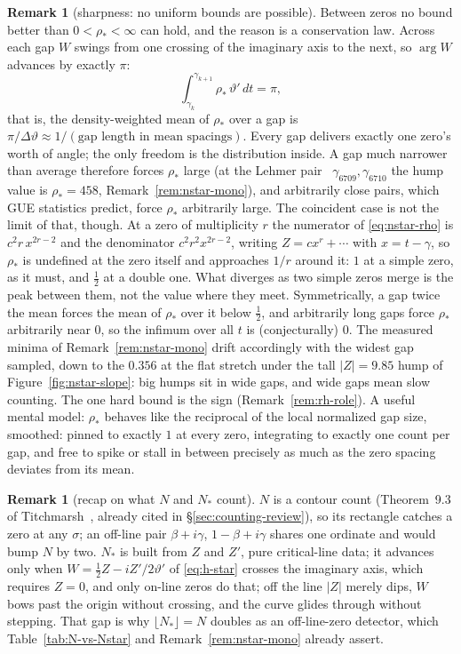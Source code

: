 \documentclass[11pt]{article}
\theoremstyle{definition}
\newtheorem{remark}[theorem]{Remark}
\begin{document}
\begin{remark}[sharpness: no uniform bounds are possible]
\label{rem:no-bounds}
Between zeros no bound better than $0<\rho_{\ast}<\infty$ can hold, and the reason
is a conservation law. Across each gap $W$ swings from one crossing of the
imaginary axis to the next, so $\arg W$ advances by exactly $\pi$:
\[
\int_{\gamma_k}^{\gamma_{k+1}}\rho_{\ast}\,\vartheta'\,dt=\pi ,
\]
that is, the density-weighted mean of $\rho_{\ast}$ over a gap is
$\pi/\Delta\vartheta\approx1/(\text{gap length in mean spacings})$. Every gap
delivers exactly one zero's worth of angle; the only freedom is the
distribution inside. A gap much narrower than average therefore forces
$\rho_{\ast}$ large (at the Lehmer pair~\cite{Lehmer1956}
$\gamma_{6709},\gamma_{6710}$ the hump value is $\rho_{\ast}=458$,
Remark~\ref{rem:nstar-mono}), and arbitrarily close pairs, which GUE
statistics predict, force $\rho_{\ast}$ arbitrarily large. The coincident case
is not the limit of that, though. At a zero of multiplicity $r$ the numerator
of \eqref{eq:nstar-rho} is $c^{2}r\,x^{2r-2}$ and the denominator
$c^{2}r^{2}x^{2r-2}$, writing $Z=cx^{r}+\cdots$ with $x=t-\gamma$, so
$\rho_{\ast}$ is undefined at the zero itself and approaches $1/r$ around it:
$1$ at a simple zero, as it must, and $\tfrac12$ at a double one. What
diverges as two simple zeros merge is the peak between them, not the value
where they meet. Symmetrically, a gap
twice the mean forces the mean of $\rho_{\ast}$ over it below $\tfrac12$, and
arbitrarily long gaps force $\rho_{\ast}$ arbitrarily near $0$, so the infimum over
all $t$ is (conjecturally) $0$. The measured minima of
Remark~\ref{rem:nstar-mono} drift accordingly with the widest gap sampled,
down to the $0.356$ at the flat stretch under the tall
$|Z|=9.85$ hump of Figure~\ref{fig:nstar-slope}: big humps sit in wide
gaps, and wide gaps mean slow counting. The one hard bound is the sign
(Remark~\ref{rem:rh-role}). A useful mental model: $\rho_{\ast}$
behaves like the reciprocal of the local normalized gap size, smoothed:
pinned to exactly $1$ at every zero, integrating to exactly one count per
gap, and free to spike or stall in between precisely as much as the zero
spacing deviates from its mean.
\end{remark}

\begin{remark}[recap on what $N$ and $N_{\ast}$ count]\label{rem:count-recap}
$N$ is a contour count (Theorem~9.3 of Titchmarsh~\cite{Titchmarsh1986},
already cited in \S\ref{sec:counting-review}), so its rectangle catches a
zero at any $\sigma$; an off-line pair $\beta+i\gamma$, $1-\beta+i\gamma$
shares one ordinate and would bump $N$ by two. $N_{\ast}$ is built from $Z$
and $Z'$, pure critical-line data; it advances only when
$W=\tfrac12Z-iZ'/2\vartheta'$ of \eqref{eq:h-star} crosses the imaginary
axis, which requires $Z=0$, and only on-line zeros do that; off the line
$|Z|$ merely dips, $W$ bows past the origin without crossing, and the curve
glides through without stepping. That gap is why
$\lfloor N_{\ast}\rfloor=N$ doubles as an off-line-zero detector, which
Table~\ref{tab:N-vs-Nstar} and Remark~\ref{rem:nstar-mono} already assert.
\end{remark}
\end{document}
